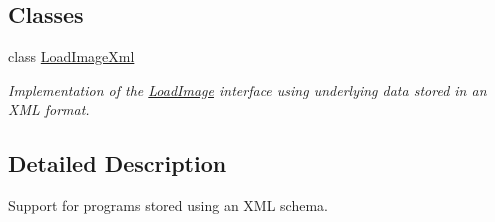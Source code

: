 \subsection*{Classes}
\begin{DoxyCompactItemize}
\item 
class \mbox{\hyperlink{class_load_image_xml}{Load\+Image\+Xml}}
\begin{DoxyCompactList}\small\item\em Implementation of the \mbox{\hyperlink{class_load_image}{Load\+Image}} interface using underlying data stored in an X\+ML format. \end{DoxyCompactList}\end{DoxyCompactItemize}


\subsection{Detailed Description}
Support for programs stored using an X\+ML schema. 


